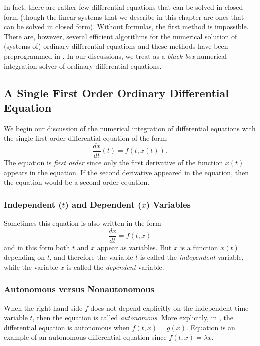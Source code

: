 In fact, there are rather few differential equations that can be
solved in closed form (though the linear systems that we
describe in this chapter are ones that can be solved in closed
form).  Without formulas, the first method is impossible.  There
are, however, several efficient algorithms for the numerical
solution of (systems of) ordinary differential equations and
these methods have been preprogrammed in \Matlabp.  In our
discussions, we treat \Matlab as a {\em black box\/} numerical
integration solver of ordinary differential equations.

\subsection*{A Single First Order Ordinary Differential Equation}

We begin our discussion of the numerical integration of
differential equations with the single first order  differential equation
of the form:
\begin{equation} \label{nonaut}
\frac{dx}{dt}(t) = f(t,x(t)).
\end{equation}
The equation is {\em first order\/} since only the first
derivative of the function $x(t)$ appears in the equation. If
the second derivative appeared in the equation, then the equation
would be a second order equation.

\subsubsection*{Independent ($t$) and Dependent ($x$) Variables}

Sometimes this equation is also written in the form
\begin{equation}  \label{nonaut2}
	\frac{dx}{dt} = f(t,x)
\end{equation}
and in this form both $t$ and $x$ appear as variables.  But $x$
is a function $x(t)$ depending on $t$, and therefore the
variable $t$ is called the {\em independent\/}
 variable, while the variable $x$ is
called the {\em dependent\/}  variable.

\subsubsection*{Autonomous versus Nonautonomous}

When the right hand side $f$ does not depend explicitly on the
independent time variable $t$, then the equation is called {\em
autonomous\/}.
More explicitly, in
, the differential equation is autonomous when
$f(t,x)=g(x)$.  Equation  is an example of an
autonomous differential equation since $f(t,x)=\lambda x$.

